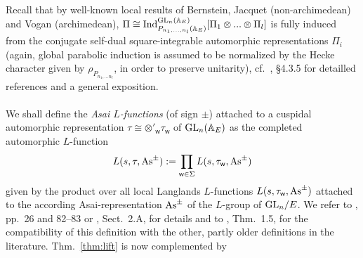 \documentclass[a4paper,10pt]{amsart}
\theoremstyle{definition}
\numberwithin{equation}{section}
\def\A{\mathbb A}
\def\ww{\mathsf w}
\def\GL{{\rm GL}}
\begin{document}
\noindent Recall that by well-known local results of Bernstein, Jacquet (non-archimedean) and Vogan (archimedean), $\Pi\cong{\rm Ind}_{P_{n_1,...,n_l}(\A_E)}^{\GL_n(\A_E)}[\Pi_1\otimes...\otimes\Pi_l]$ is fully induced from the conjugate self-dual square-integrable automorphic representations $\Pi_i$ (again, global parabolic induction is assumed to be normalized by the Hecke character given by $\rho_{P_{n_1,...n_l}}$, in order to preserve unitarity), cf.\ \cite{grob_book}, \S 4.3.5 for detailled references and a general exposition.\\\\ 
We shall define the  {\it Asai $L$-functions} (of sign $\pm$) attached to a cuspidal automorphic representation $\tau\cong \otimes'_\ww \tau_\ww$ of $\GL_n(\A_E)$ as the completed automorphic $L$-function 
$$L(s,\tau,{\rm As}^{\pm}):=\prod_{\ww\in \Sigma} L(s,\tau_\ww,{\rm As}^{\pm})$$
given by the product over all local Langlands $L$-functions $L(s,\tau_\ww,{\rm As}^{\pm})$ attached to the according Asai-representation ${\rm As}^{\pm}$ of the $L$-group of $\GL_n/E$. We refer to \cite{ggp}, pp.\ 26 and 82--83 or \cite{grbacshahidi}, Sect.\ 2.A, for details and to \cite{henniartAsai}, Thm.\ 1.5, for the compatibility of this definition with the other, partly older definitions in the literature. Thm.\ \ref{thm:lift} is now complemented by
\end{document}
